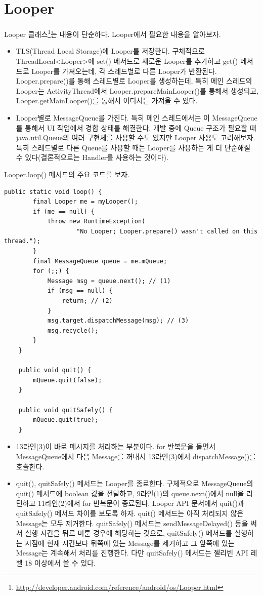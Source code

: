 \section{Looper}
Looper 클래스\footnote{\url{http://developer.android.com/reference/android/os/Looper.html}}는 내용이 단순하다. Looper에서 필요한 내용을 알아보자.
\begin{itemize}
\item TLS(Thread Local Storage)에 Looper를 저장한다. 구체적으로 ThreadLocal<Looper>에 set() 메서드로 새로운 Looper를 추가하고 get() 메서드로 Looper를 가져오는데, 각 스레드별로 다른 Looper가 반환된다.
Looper.prepare()를 통해 스레드별로 Looper를 생성하는데, 특히 메인 스레드의 Looper는 ActivityThread에서 Looper.prepareMainLooper()를 통해서 생성되고, Looper.getMainLooper()를 통해서 어디서든 가져올 수 있다.
\item Looper별로 MessageQueue를 가진다. 특히 메인 스레드에서는 이 MessageQueue를 통해서 UI 작업에서 경합 상태를 해결한다. 
개발 중에 Queue 구조가 필요할 때 java.util.Queue의 여러 구현체를 사용할 수도 있지만 Looper 사용도 고려해보자. 특히 스레드별로 다른 Queue를 사용할 때는 Looper를 사용하는 게 더 단순해질 수 있다(결론적으로는 Handler를 사용하는 것이다).
\end{itemize}

Looper.loop() 메서드의 주요 코드를 보자.
\begin{lstlisting}[frame=single, caption=Looper.java] 
	public static void loop() {
		final Looper me = myLooper();
		if (me == null) {
			throw new RuntimeException(
					"No Looper; Looper.prepare() wasn't called on this thread.");
		}
		final MessageQueue queue = me.mQueue;
		for (;;) {
			Message msg = queue.next(); // (1)
			if (msg == null) {
				return; // (2)
			}
			msg.target.dispatchMessage(msg); // (3)
			msg.recycle();
		}
	}
	
	public void quit() {
        mQueue.quit(false);
    }
    
    public void quitSafely() {
        mQueue.quit(true);
    }
\end{lstlisting}	
\begin{itemize}
\item 13라인(3)이 바로 메시지를 처리하는 부분이다. 
for 반복문을 돌면서 MessageQueue에서 다음 Message를 꺼내서 13라인(3)에서 dispatchMessage()를 호출한다. 
\item quit(), quitSafely() 메서드는 Looper를 종료한다. 구체적으로 MessageQueue의 quit() 메서드에 boolean 값을 전달하고, 9라인(1)의 queue.next()에서 null을 리턴하고 11라인(2)에서 for 반복문이 종료된다.
Looper API 문서에서 quit()과 quitSafely() 메서드 차이를 보도록 하자.
quit() 메서드는 아직 처리되지 않은 Message는 모두 제거한다.
quitSafely() 메서드는 sendMessageDelayed() 등을 써서 실행 시간을 뒤로 미룬 경우에 해당하는 것으로, quitSafely() 메서드를 실행하는 시점에 현재 시간보다 뒤쪽에 있는 Message를 제거하고 그 앞쪽에 있는 Message는 계속해서 처리를 진행한다. 다만 quitSafely() 메서드는 젤리빈 API 레벨 18 이상에서 쓸 수 있다.\\
\end{itemize}

